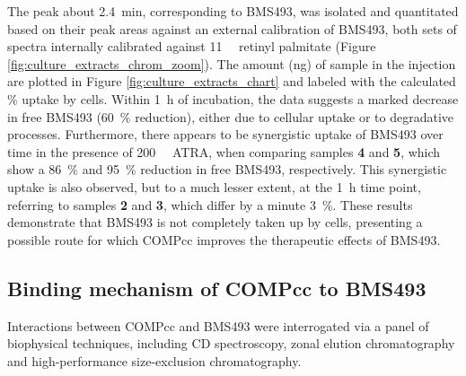 \begin{refsection}
The peak about \SI{2.4}{\minute}, corresponding to BMS493, was isolated and
quantitated based on their peak areas against an external calibration of BMS493,
both sets of spectra internally calibrated against \SI{11}{\micro\moLar} retinyl
palmitate (Figure \ref{fig:culture_extracts_chrom_zoom}). The amount (\si{\ng})
of sample in the injection are plotted in Figure
\ref{fig:culture_extracts_chart} and labeled with the calculated \% uptake by
cells. Within \SI{1}{\hour} of incubation, the data suggests a marked decrease
in free BMS493 (\SI{60}{\percent} reduction), either due to cellular uptake or
to degradative processes.  Furthermore, there appears to be synergistic uptake
of BMS493 over time in the presence of \SI{200}{\nano\moLar} ATRA, when
comparing samples \textbf{4} and \textbf{5}, which show a \SI{86}{\percent} and
\SI{95}{\percent} reduction in free BMS493, respectively. This synergistic
uptake is also observed, but to a much lesser extent, at the \SI{1}{\hour} time
point, referring to samples \textbf{2} and \textbf{3}, which differ by a minute
\SI{3}{\percent}. These results demonstrate that BMS493 is not completely taken
up by cells, presenting a possible route for which COMPcc improves the
therapeutic effects of BMS493.

\subsection{Binding mechanism of COMPcc to BMS493}
\label{sec:binding_mechanism}
Interactions between COMPcc and BMS493 were interrogated via a panel of
biophysical techniques, including CD spectroscopy, zonal elution chromatography
and high-performance size-exclusion chromatography.


\end{refsection}
